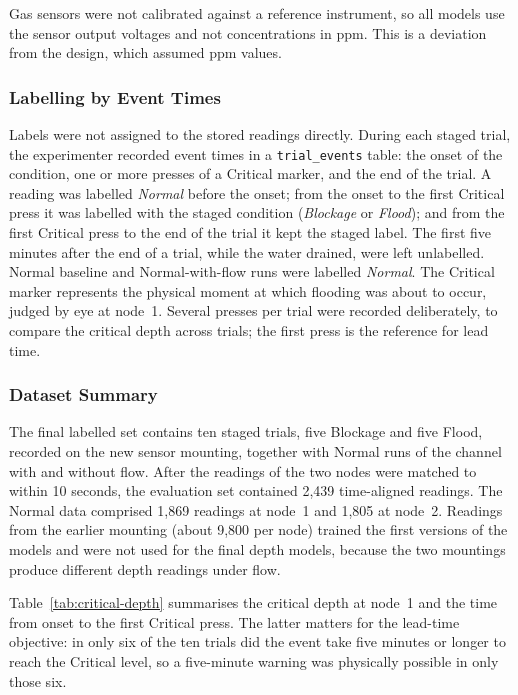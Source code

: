 \documentclass[12pt, a4paper]{article}
\begin{document}
Gas sensors were not calibrated against a reference instrument, so all models use the sensor output voltages and not concentrations in ppm. This is a deviation from the design, which assumed ppm values.

\subsubsection{Labelling by Event Times}

Labels were not assigned to the stored readings directly. During each staged trial, the experimenter recorded event times in a \texttt{trial\_events} table: the onset of the condition, one or more presses of a Critical marker, and the end of the trial. A reading was labelled \emph{Normal} before the onset; from the onset to the first Critical press it was labelled with the staged condition (\emph{Blockage} or \emph{Flood}); and from the first Critical press to the end of the trial it kept the staged label. The first five minutes after the end of a trial, while the water drained, were left unlabelled. Normal baseline and Normal-with-flow runs were labelled \emph{Normal}. The Critical marker represents the physical moment at which flooding was about to occur, judged by eye at node~1. Several presses per trial were recorded deliberately, to compare the critical depth across trials; the first press is the reference for lead time.

\subsubsection{Dataset Summary}

The final labelled set contains ten staged trials, five Blockage and five Flood, recorded on the new sensor mounting, together with Normal runs of the channel with and without flow. After the readings of the two nodes were matched to within 10 seconds, the evaluation set contained 2{,}439 time-aligned readings. The Normal data comprised 1{,}869 readings at node~1 and 1{,}805 at node~2. Readings from the earlier mounting (about 9{,}800 per node) trained the first versions of the models and were not used for the final depth models, because the two mountings produce different depth readings under flow.

Table~\ref{tab:critical-depth} summarises the critical depth at node~1 and the time from onset to the first Critical press. The latter matters for the lead-time objective: in only six of the ten trials did the event take five minutes or longer to reach the Critical level, so a five-minute warning was physically possible in only those six.
\end{document}
